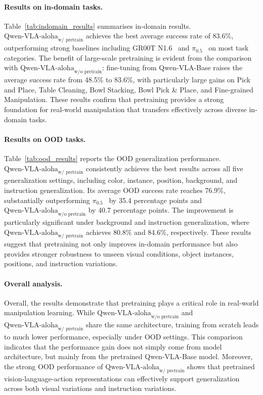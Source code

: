 \documentclass{llmxive}
\begin{document}
    \paragraph{Results on in-domain tasks.}
        Table~\ref{tab:indomain_results} summarises in-domain results.
    ${\text{Qwen-VLA-aloha}}_{\text{w/ pretrain}}$ achieves the best average success rate of 83.6\%, outperforming strong baselines including GR00T N1.6~\citep{nvidia2025gr00t} and $\pi_{0.5}$~\citep{black2025pi05} on most task categories.
    The benefit of large-scale pretraining is evident from the comparison with
    ${\text{Qwen-VLA-aloha}}_{\text{w/o pretrain}}$:
    fine-tuning from Qwen-VLA-Base raises the average success rate from 48.5\% to 83.6\%, with particularly large gains on Pick and Place, Table Cleaning, Bowl Stacking, Bowl Pick \& Place, and Fine-grained Manipulation.
    These results confirm that pretraining provides a strong foundation for real-world manipulation that transfers effectively across diverse in-domain tasks.

    
    
    \paragraph{Results on OOD tasks.}
    Table~\ref{tab:ood_results} reports the OOD generalization performance. ${\text{Qwen-VLA-aloha}}_{\text{w/ pretrain}}$ consistently achieves the best results across all five generalization settings, including color, instance, position, background, and instruction generalization. Its average OOD success rate reaches 76.9\%, substantially outperforming $\pi_{0.5}$~\citep{black2025pi05} by 35.4 percentage points and ${\text{Qwen-VLA-aloha}}_{\text{w/o pretrain}}$ by 40.7 percentage points. The improvement is particularly significant under background and instruction generalization, where ${\text{Qwen-VLA-aloha}}_{\text{w/ pretrain}}$ achieves 80.8\% and 84.6\%, respectively. These results suggest that pretraining not only improves in-domain performance but also provides stronger robustness to unseen visual conditions, object instances, positions, and instruction variations.
    
    \paragraph{Overall analysis.}
    Overall, the results demonstrate that pretraining plays a critical role in real-world manipulation learning. While ${\text{Qwen-VLA-aloha}}_{\text{w/o pretrain}}$ and ${\text{Qwen-VLA-aloha}}_{\text{w/ pretrain}}$ share the same architecture, training from scratch leads to much lower performance, especially under OOD settings. This comparison indicates that the performance gain does not simply come from model architecture, but mainly from the pretrained Qwen-VLA-Base model. Moreover, the strong OOD performance of ${\text{Qwen-VLA-aloha}}_{\text{w/ pretrain}}$ shows that pretrained vision-language-action representations can effectively support generalization across both visual variations and instruction variations.
    
\end{document}
